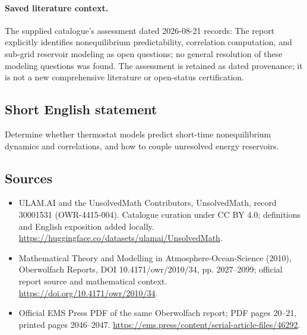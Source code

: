 \documentclass[11pt]{article}
\begin{document}
\paragraph{Saved literature context.} The supplied catalogue's assessment dated 2026-08-21 records: The report explicitly identifies nonequilibrium predictability, correlation computation, and sub-grid reservoir modeling as open questions; no general resolution of these modeling questions was found. The assessment is retained as dated provenance; it is not a new comprehensive literature or open-status certification.
\subsection{Short English statement}
Determine whether thermostat models predict short-time nonequilibrium dynamics and correlations, and how to couple unresolved energy reservoirs.
\subsection{Sources}
\begin{itemize}
\item[\hypertarget{source:30001531:1}{S1}] ULAM.AI and the UnsolvedMath Contributors, UnsolvedMath, record 30001531 (OWR-4415-004). Catalogue curation under CC BY 4.0; definitions and English exposition added locally.
\url{https://huggingface.co/datasets/ulamai/UnsolvedMath}.
\item[\hypertarget{source:30001531:2}{S2}] Mathematical Theory and Modelling in Atmosphere-Ocean-Science (2010), Oberwolfach Reports, DOI 10.4171/owr/2010/34, pp. 2027--2099; official report source and mathematical context.
\url{https://doi.org/10.4171/owr/2010/34}.
\item[\hypertarget{source:30001531:3}{S3}] Official EMS Press PDF of the same Oberwolfach report; PDF pages 20--21, printed pages 2046--2047.
\url{https://ems.press/content/serial-article-files/46292}.
\end{itemize}
\label{end:30001531}
\end{document}
